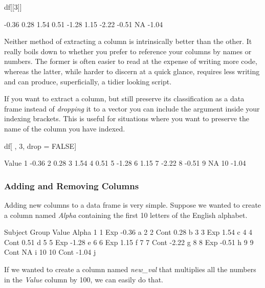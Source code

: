 \begin{inR}
df[[3]]
\end{inR}
\begin{outR}
[1] -0.36  0.28  1.54  0.51 -1.28  1.15 -2.22 -0.51  NA -1.04
\end{outR}

Neither method of extracting a column is intrinsically better than the other.  It really boils down to whether you prefer to reference your columns by names or numbers. The former is often easier to read at the expense of writing more code, whereas the latter, while harder to discern at a quick glance, requires less writing and can produce, superficially, a tidier looking script.

If you want to extract a column, but still preserve its classification as a data frame instead of \textit{dropping} it to a vector you can include the argument  inside your indexing brackets. This is useful for situations where you want to preserve the name of the column you have indexed.

\begin{inR}
df[ , 3, drop = FALSE]
\end{inR}
\begin{outR}
   Value
1  -0.36
2   0.28
3   1.54
4   0.51
5  -1.28
6   1.15
7  -2.22
8  -0.51
9     NA
10 -1.04
\end{outR}

\subsubsection{Adding and Removing Columns}

Adding new columns to a data frame is very simple. Suppose we wanted to create a column named \textit{Alpha} containing the first 10 letters of the English alphabet.

\begin{outR}
   Subject Group Value Alpha
1        1   Exp -0.36     a
2        2  Cont  0.28     b
3        3   Exp  1.54     c
4        4  Cont  0.51     d
5        5   Exp -1.28     e
6        6   Exp  1.15     f
7        7  Cont -2.22     g
8        8   Exp -0.51     h
9        9  Cont    NA     i
10      10  Cont -1.04     j
\end{outR}

If we wanted to create a column named \textit{new\_val} that multiplies all the numbers in the \textit{Value} column by 100, we can easily do that.

